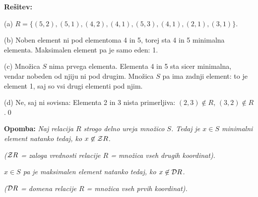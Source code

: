 \documentclass[11pt,paper=b5,footinclude,headinclude]{scrbook} %
\begin{document}
\textbf{Rešitev:}

(a) $R = \{(5,2),(5,1),(4,2),(4,1),(5,3),(4,1),(2,1),(3,1)\}$.

(b) Noben element ni pod elementoma 4 in 5, torej sta 4 in 5 minimalna elementa.
Maksimalen element pa je samo eden: 1.

(c) Množica $S$ nima prvega elementa. Elementa 4 in 5 sta sicer minimalna, vendar nobeden
od njiju ni pod drugim. Množica $S$ pa ima zadnji element: to je element 1, saj so vsi drugi elementi
pod njim.

(d) Ne, saj ni sovisna: Elementa 2 in 3 nista primerljiva: $(2,3)\not\in R$, $(3,2)\not\in R$.\qed

\bigskip
\textbf{Opomba:} \emph{Naj relacija $R$ strogo delno ureja množico $S$.
Tedaj je $x\in S$ minimalni element natanko tedaj, ko $x\not\in {\cal Z}R$.}

\emph{(${\cal Z}R$ = zaloga vrednosti relacije $R$ = množica vseh drugih koordinat).}

\emph{$x\in S$ pa je maksimalen element natanko tedaj, ko $x\not\in {\cal D}R$.}

\emph{(${\cal D}R$ = domena relacije $R$ = množica vseh prvih koordinat).}
\end{document}
